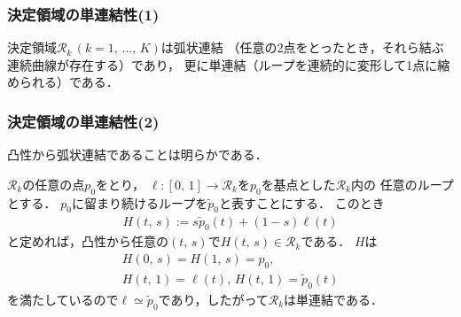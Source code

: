 \documentclass[10pt,%
hyperref={unicode}]{beamer}
\makeatletter
\renewenvironment{proof}{\par%
\pushQED{\qed}\normalfont\topsep6\p@\@plus6\p@\relax\trivlist%
\item[\hskip\labelsep{\bfseries 証明}\hskip\labelsep]\ignorespaces}{\popQED\endtrivlist\@endpefalse}
\makeatother
\begin{document}
\begin{frame}
    \frametitle{決定領域の単連結性(1)}

    決定領域$\mathcal{R}_k\,(k = 1,\,\ldots,\,K)$は弧状連結
    （任意の2点をとったとき，それら結ぶ連続曲線が存在する）であり，
    更に単連結（ループを連続的に変形して1点に縮められる）である．

    \smallskip

    \begin{figure}
        \caption{}
        \begin{center}
        \end{center}
    \end{figure}
\end{frame}

\begin{frame}
    \frametitle{決定領域の単連結性(2)}

    \begin{proof}
    凸性から弧状連結であることは明らかである．

    $\mathcal{R}_k$の任意の点$p_0$をとり，
    $\ell:[0,\,1] \to \mathcal{R}_k$を$p_0$を基点とした$\mathcal{R}_k$内の
    任意のループとする．
    $p_0$に留まり続けるループを$\tilde{p}_0$と表すことにする．
    このとき
    \begin{align*}
        H(t,\,s) := s \tilde{p}_0(t) + (1 - s) \ell (t)
    \end{align*}
    と定めれば，凸性から任意の$(t,\,s)$で$H(t,\,s) \in \mathcal{R}_k$である．
    $H$は
    \begin{gather*}
        H(0,\,s) = H(1,\,s) = p_0,\\
        H(t,\,1) = \ell(t),\,H(t,\,1) = \tilde{p}_0(t)
    \end{gather*}
    を満たしているので$\ell \simeq \tilde{p}_0$であり，したがって$\mathcal{R}_k$は単連結である．
    \end{proof}
\end{frame}
\end{document}
